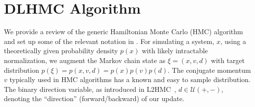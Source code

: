 \documentclass{article} %
\begin{document}
\section{\label{sec:method}DLHMC Algorithm}
%
We provide a review of the generic Hamiltonian Monte Carlo (HMC) algorithm and set up some of the relevant notation in
.
%
For simulating a system, $x$, using a theoretically given probability density $p(x)$ with likely intractable normalization,
we augment the Markov chain state as
\(\xi = (x, v, d)\) with target distribution \(p(\xi) = p(x, v, d) = p(x) p(v) p(d)\).
The conjugate momentum $v$ typically used in HMC algorithms has a known and easy to sample distribution.
%
The binary direction variable, as introduced in L2HMC~\citep{levy2017},
\(d\in\mathcal{U}(+,-)\), %
denoting the ``direction'' (forward/backward) of our update.
%
%
\end{document}
